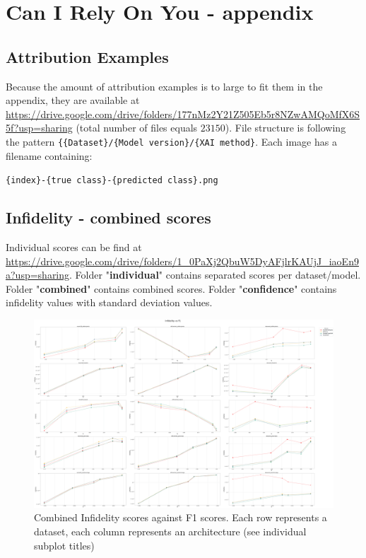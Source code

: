 \section{Can I Rely On You - appendix}\label{appendix:can-i-rely}

\subsection*{Attribution Examples}\label{appendix:attribution-examples}

Because the amount of attribution examples is to large to fit them in the appendix, they are available at \url{https://drive.google.com/drive/folders/177nMz2Y21Z505Eb5r8NZwAMQoMfX6S5f?usp=sharing} (total number of files equals $23150$). File structure is following the pattern \verb|{{Dataset}/{Model version}/{XAI method}|. Each image has a filename containing:

\verb|{index}-{true class}-{predicted class}.png|

\subsection{Infidelity - combined scores}\label{appendix:combined-inf}

Individual scores can be find at \url{https://drive.google.com/drive/folders/1_0PaXj2QbuW5DyAFjlrKAUjJ_iaoEn9a?usp=sharing}. Folder "\textbf{individual}" contains separated scores per dataset/model. Folder "\textbf{combined}" contains combined scores. Folder "\textbf{confidence}" contains infidelity values with standard deviation values.

\begin{figure}[ht]
  \centering
  \includegraphics[width=\textwidth]{appendixes/images/inf-combined-f1.png}
  \caption{Combined Infidelity scores against F1 scores. Each row represents a dataset, each column represents an architecture (see individual subplot titles)}\label{fig:combined-infidelity}
\end{figure}

